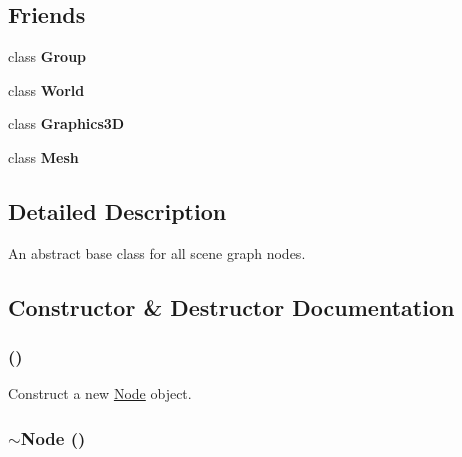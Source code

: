 \subsection*{Friends}
\begin{CompactItemize}
\item 
\hypertarget{classm3g_1_1Node_2697825715974a353728f0d4d5658112}{
class \textbf{Group}}
\label{classm3g_1_1Node_2697825715974a353728f0d4d5658112}

\item 
\hypertarget{classm3g_1_1Node_7b4bcdf992c21ae83363f25df05b1d25}{
class \textbf{World}}
\label{classm3g_1_1Node_7b4bcdf992c21ae83363f25df05b1d25}

\item 
\hypertarget{classm3g_1_1Node_8174d4c629550c1ee279571250236ef4}{
class \textbf{Graphics3D}}
\label{classm3g_1_1Node_8174d4c629550c1ee279571250236ef4}

\item 
\hypertarget{classm3g_1_1Node_a41a130f156b145bffb3f4b5172c4c93}{
class \textbf{Mesh}}
\label{classm3g_1_1Node_a41a130f156b145bffb3f4b5172c4c93}

\end{CompactItemize}


\subsection{Detailed Description}
An abstract base class for all scene graph nodes. 

\subsection{Constructor \& Destructor Documentation}
\hypertarget{classm3g_1_1Node_0d313fac56abd7ebe58a17f1530b879e}{
\subsubsection[{Node}]{ ()}}
\label{classm3g_1_1Node_0d313fac56abd7ebe58a17f1530b879e}


Construct a new \hyperlink{classm3g_1_1Node}{Node} object. \hypertarget{classm3g_1_1Node_6fa6bf60f34f1e3efb0e59333428c9c8}{
\subsubsection[{$\sim$Node}]{\setlength{\rightskip}{0pt plus 5cm}$\sim${\bf Node} ()}}
\label{classm3g_1_1Node_6fa6bf60f34f1e3efb0e59333428c9c8}


